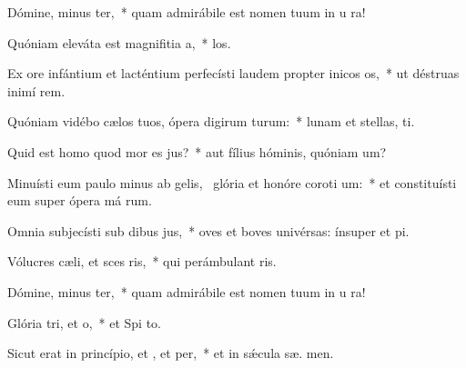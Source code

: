 \item Dómine, minus ter,~* quam admirábile est nomen tuum in u ra!
\item Quóniam eleváta est magnifitia a,~*  los.
\item Ex ore infántium et lacténtium perfecísti laudem propter inicos os,~* ut déstruas inimí  rem.
\item Quóniam vidébo cælos tuos, ópera digirum turum:~* lunam et stellas,   ti.
\item Quid est homo quod mor es jus?~* aut fílius hóminis, quóniam  um?
\item Minuísti eum paulo minus ab gelis,~\pscross{} glória et honóre coroti um:~* et constituísti eum super ópera má rum.
\item Omnia subjecísti sub dibus jus,~* oves et boves univérsas: ínsuper et  pi.
\item Vólucres cæli, et sces ris,~* qui perámbulant  ris.
\item Dómine, minus ter,~* quam admirábile est nomen tuum in u ra!
\item Glória tri, et o,~* et Spi to.
\item Sicut erat in princípio, et , et per,~* et in sǽcula sæ. men.
